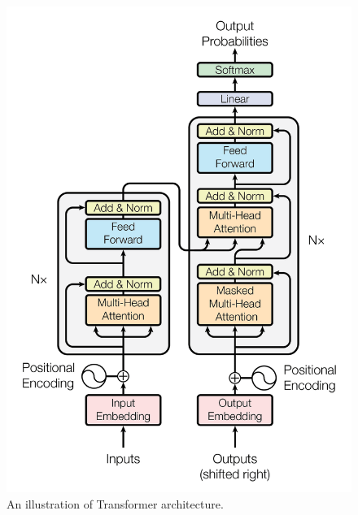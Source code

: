
\begin{figure}[t]
	\centering
	\includegraphics[scale=0.2]{./images/transformer/transformer.png}
	\caption{An illustration of Transformer architecture.}
\end{figure}

